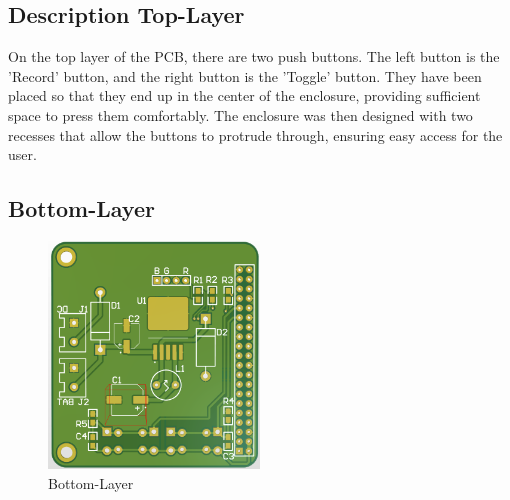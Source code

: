 \subsection*{Description Top-Layer}
On the top layer of the PCB, there are two push buttons. The left button is the 'Record' button, and the right button is the 'Toggle' button. They have been placed so that they end up in the center of the enclosure, providing sufficient space to press them comfortably. The enclosure was then designed with two recesses that allow the buttons to protrude through, ensuring easy access for the user.

\newpage

\subsection{Bottom-Layer}

\begin{figure}[ht]
    \centering
    \includegraphics[width=0.5\textwidth]{assets/Bottom Layer.png}
    \caption{Bottom-Layer}
    \label{fig:bottom-layer}
\end{figure}


